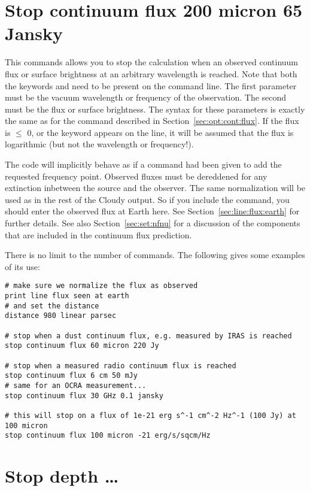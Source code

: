 \section{Stop continuum flux 200 micron 65 Jansky}

This commands allows you to stop the calculation when an observed continuum
flux or surface brightness at an arbitrary wavelength is reached. Note that
both the keywords  and  need to be
present on the command line. The first parameter must be the vacuum wavelength or
frequency of the observation. The second must be the flux or surface
brightness. The syntax for these parameters is exactly the same as for the
 command described in
Section~\ref{sec:opt:cont:flux}. If the flux is $\leq$ 0, or the keyword
 appears on the line, it will be assumed that the flux is
logarithmic (but not the wavelength or frequency!).

The code will implicitly behave as if a  command had
been given to add the requested frequency point.
Observed fluxes must be dereddened for any extinction inbetween the
source and the observer. The same normalization will be used as in the rest of
the Cloudy output. So if you include the 
command, you should enter the observed flux at Earth here. See
Section~\ref{sec:line:flux:earth} for further details. See also
Section~\ref{sec:set:nfnu} for a discussion of the components that are
included in the continuum flux prediction.

There is no limit to the number of 
commands. The following gives some examples of its use:
\begin{verbatim}
# make sure we normalize the flux as observed
print line flux seen at earth
# and set the distance
distance 980 linear parsec

# stop when a dust continuum flux, e.g. measured by IRAS is reached
stop continuum flux 60 micron 220 Jy

# stop when a measured radio continuum flux is reached
stop continuum flux 6 cm 50 mJy
# same for an OCRA measurement...
stop continuum flux 30 GHz 0.1 jansky

# this will stop on a flux of 1e-21 erg s^-1 cm^-2 Hz^-1 (100 Jy) at 100 micron
stop continuum flux 100 micron -21 erg/s/sqcm/Hz
\end{verbatim}

\section{Stop depth \dots}

